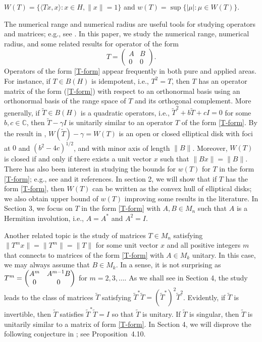 \documentclass[11pt]{article}
\numberwithin{equation}{section}
\def\IC{{\mathbb C}}
\begin{document}
\medskip
\centerline{
$W(T) = \{ \langle Tx,x \rangle: x \in H, \|x\| = 1\}$ \quad
and  \quad
$w(T) = \sup \{ |\mu|: \mu \in W(T)\}.$}

\medskip\noindent
The numerical range and numerical radius are useful tools for  studying
operators and matrices; e.g., see \cite{HJ,WG}.
In this paper, we study the numerical range, numerical radius, and some related results
for operator of the form
\begin{equation}\label{T-form}
T = \begin{pmatrix} A & B \\ 0 & 0 \end{pmatrix}.
\end{equation}
Operators of the form \eqref{T-form} appear frequently in both pure and applied areas.
For instance, if $T\in B(H)$ is idempotent, i.e., $T^2 = T$, then $T$ has an operator matrix of
the form (\ref{T-form}) with respect to an orthonormal basis using an orthonormal basis
of the range space of $T$ and its orthogonal complement.  More generally, if $\tilde{T}\in B(H)$
is a quadratic operators, i.e., $\tilde{T}^2 + b\tilde{T} + cI = 0$ for some $b, c \in \IC$,
then $\tilde{T} - \gamma I$ is unitarily similar to an operator $T$ of the form \eqref{T-form}.
By the result in \cite{TW}, $W(\tilde T) - \gamma = W(T)$
is an open or closed elliptical disk with foci at $0$ and $(b^2-4c)^{1/2}$, and with minor axis
of length $\|B\|$. Moreover, $W(T)$ is closed if and only if there
exists a unit vector $x$ such that $\|Bx\| = \|B\|$. There has also been interest in studying
the bounds for $w(T)$ for $T$ in the form \eqref{T-form}; e.g., see \cite{S} and it references.
In section 2, we will show that if $T$ has the form
\eqref{T-form}, then $W(T)$ can be written as the convex hull of elliptical disks; we also
obtain upper bound of $w(T)$ improving some results in the literature. In Section 3, we focus
on $T$ in the form \eqref{T-form} with $A, B \in M_n$ such that $A$ is a Hermitian involution,
i.e., $A = A^*$ and $A^2 = I$.

Another related topic is the
study of matrices $T \in M_n$ satisfying $\|T^m x\| = \|T^m\|=\|T\|$ for some unit vector $x$
and all positive integers $m$ that connects to
matrices of the form \eqref{T-form} with $A \in M_k$ unitary.
In this case, we may always assume that $B \in M_k$. In a sense, it is not surprising as
$T^m = \begin{pmatrix} A^m & A^{m-1}B\cr 0 & 0 \cr\end{pmatrix}$ for $m = 2, 3, \dots$.
As we shall see in Section 4, the study leads to the class of matrices
$\tilde T$ satisfying $\tilde T^*\tilde T = (\tilde T^*)^2 \tilde T^2$.
Evidently, if $\tilde T$ is invertible, then $\tilde T$ satisfies $\tilde T^* \tilde T = I$
so that $\tilde T$ is unitary. If $\tilde T$ is singular, then $\tilde T$ is unitarily similar
to a matrix of form \eqref{T-form}.
In Section 4, we will disprove the following conjecture in \cite{GWW}; see Proposition~4.10.
\end{document}
